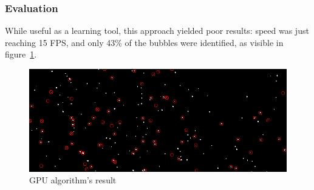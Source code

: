 \subsubsection{Evaluation}

While useful as a learning tool, this approach yielded poor results: speed was just reaching 15 FPS, and only 43\% of the bubbles were identified, as visible in figure~\ref{fig:locate:gpu}.

\begin{figure}[H]
	\centerline{\includegraphics[width=\locateimgsize]{images/locate/my-gpu-algorithm.png}}
	\caption{\centering GPU algorithm's result}
	\label{fig:locate:gpu}
\end{figure}
